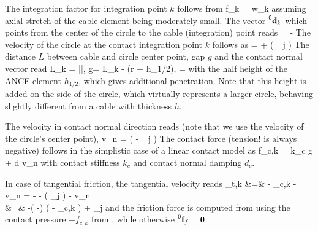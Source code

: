 \noindent The integration factor for integration point $k$ follows from
\be
  f_k =  w_k \eqComma
\ee
assuming axial stretch of the cable element being moderately small.
The vector $\prescript{0}{}{\mathbf{d}_k}\,$ which points from the center of the circle to the cable (integration) point reads
\be
  \ANCFdk =  -  
\ee
The velocity of the circle at the contact integration point $k$ follows as
\be
   =  + \left(  _{j} \right) \times \ANCFdk
\ee
The distance $L$ between cable and circle center point, gap $g$ and the contact normal vector read
\be
  L_k = |\ANCFdk|, \quad g= L_k - (r + h_{1/2}), \quad {} =  \ANCFdk
\ee
with the half height of the ANCF element $h_{1/2}$, which gives additional penetration. Note that this height is added on the side of the circle, which virtually represents a larger circle, behaving slightly different from a cable with thickness $h$.

\noindent The velocity in contact normal direction reads (note that we use the velocity of the circle's center point),
\be
  v_n =  \left(  - _j \right)
\ee
The contact force (tension! is always negative) follows in the simplistic case of a linear contact model as
\be \label{eq_GeneralContactASfc}
  f_{c,k} = k_c \cdot g  + d \cdot v_n
\ee
with contact stiffness $k_c$ and contact normal damping $d_c$.

\noindent In case of tangential friction, the tangential velocity reads
\bea
  \vv_{t,k} &=&  - _{c,k} - v_n \cdot {}
  =  -  - \left(  _{j} \right) \times \ANCFdk - v_n \cdot {} \nonumber \\
  &=& -\left( \otimes {} -\Im \right) \left(  - _{c,k} \right) 
      +  _{j} 
\eea
and the friction force is computed from  using the contact pressure $-f_{c,k}$ from , while otherwise $\prescript{0}{}{\mathbf{f}_f}\, = \mathbf{0}$.

